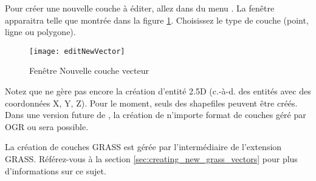 Pour créer une nouvelle couche à éditer, allez dans  du menu . La fenêtre  apparaitra telle que montrée dans la figure \ref{fig:newvectorlayer}. Choisissez le type de couche (point, ligne ou polygone).

\begin{figure}[ht]
  \begin{center}
  \texttt{[image: editNewVector]}
  \caption{Fenêtre Nouvelle couche vecteur \nixcaption}\label{fig:newvectorlayer}
\end{center}
\end{figure}

Notez que \qg ne gère pas encore la création d'entité 2.5D (c.-à-d. des entités avec des coordonnées X, Y, Z). Pour le moment, seuls des shapefiles peuvent être créés. Dans une version future de \qg, la création de n'importe format de couches géré par OGR ou \psq sera possible.

La création de couches GRASS est gérée par l'intermédiaire de l'extension GRASS. Référez-vous à la section \ref{sec:creating_new_grass_vectors} pour plus d'informations sur ce sujet.


